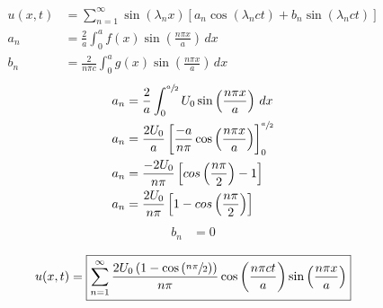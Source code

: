 \documentclass[../../HW06.tex]{subfiles}
\begin{document}
\begin{align*}
    u(x,t) & =\sum_{n=1}^{\infty}\sin(\lambda_{n}x)\left[ a_{n}\cos(\lambda_{n}ct) + b_{n}\sin(\lambda_{n}ct) \right] \\
    a_{n}  & = \frac{2}{a} \int_{0}^{a} f(x) \sin\left(\frac{n\pi x}{a}\right)\,dx                                    \\
    b_{n}  & = \frac{2}{n\pi c} \int_{0}^{a} g(x) \sin\left( \frac{n\pi x}{a} \right)\,dx
\end{align*}
\begin{align*}
    a_{n} & = \frac{2}{a}\int_{0}^{\sfrac{a}{2}} U_{0}\sin\left( \frac{n \pi x}{a} \right)\,dx                        \\
    a_{n} & = \frac{2U_{0}}{a} \left[ \frac{-a}{n\pi} \cos\left( \frac{n \pi x}{a} \right) \right]_{0}^{\sfrac{a}{2}} \\
    a_{n} & = \frac{-2U_{0}}{n\pi} \left[ cos\left( \frac{n\pi}{2} \right) - 1\right]                                 \\
    a_{n} & = \frac{2U_{0}}{n\pi} \left[ 1 - cos\left( \frac{n\pi}{2} \right)\right]
\end{align*}
\begin{align*}
    b_{n} & = 0
\end{align*}
\begin{center}
    \[
        u(x,t) = \boxed{\sum_{n=1}^{\infty} \frac{2U_{0}\left( 1-\cos\left( \sfrac{n\pi}{2} \right) \right)}{n\pi}\cos\left( \frac{n\pi ct}{a} \right)\sin\left( \frac{n\pi x}{a} \right)}
    \]
\end{center}
\end{document}

